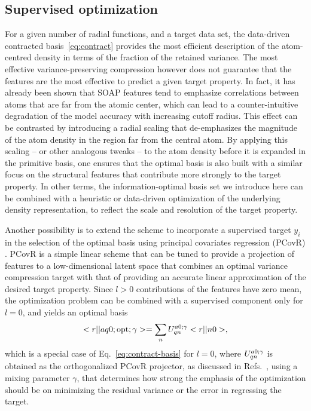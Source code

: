 \subsection{Supervised optimization}
For a given number of radial functions, and a target data set, the data-driven contracted basis~\eqref{eq:contract} provides the most efficient description of the atom-centred density in terms of the fraction of the retained variance.
The most effective variance-preserving compression however does not guarantee that the features are the most effective to predict a given target property.
In fact, it has already been shown that SOAP features tend to emphasize correlations between atoms that are far from the atomic center, which can lead to a counter-intuitive degradation of the model accuracy with increasing cutoff radius\cite{bart+17sa,will+18pccp}. 
This effect can be contrasted by introducing a radial scaling\cite{huan-vonl16jcp,will+18pccp} that de-emphasizes the magnitude of the atom density in the region far from the central atom. 
By applying this scaling -- or other analogous tweaks\cite{caro19prb} -- to the atom density before it is expanded in the primitive basis, one ensures that the optimal basis is also built with a similar focus on the structural features that contribute more strongly to the target property.
In other terms, the information-optimal basis set we introduce here can be combined with a heuristic or data-driven optimization of the underlying density representation, to reflect the scale and resolution of the target property.

Another possibility is to extend the scheme to incorporate a supervised target $y_i$ in the selection of the optimal basis using principal covariates regression (PCovR) \cite{dejo-kier92cils,helf+20mlst}.
PCovR is a simple linear scheme that can be tuned to provide a projection of features to a low-dimensional latent space that combines an optimal variance compression target with that of providing an accurate linear approximation of the desired target property. 
Since $l>0$ contributions of the features have zero mean, the optimization problem can be combined with a supervised component only for $l=0$, and yields an optimal basis
\begin{equation}
<r||  aq 0; \text{opt}; \gamma> = \sum_n U^{a0;\gamma}_{qn} <r||n0>,
\end{equation}
which is a special case of Eq.~\eqref{eq:contract-basis} for $l=0$, 
where $U^{a0;\gamma}_{qn}$ is obtained as the orthogonalized PCovR projector, as discussed in Refs.~, using a mixing parameter $\gamma$, that determines how strong the emphasis of the optimization should be on minimizing the residual variance or the error in regressing the target.

